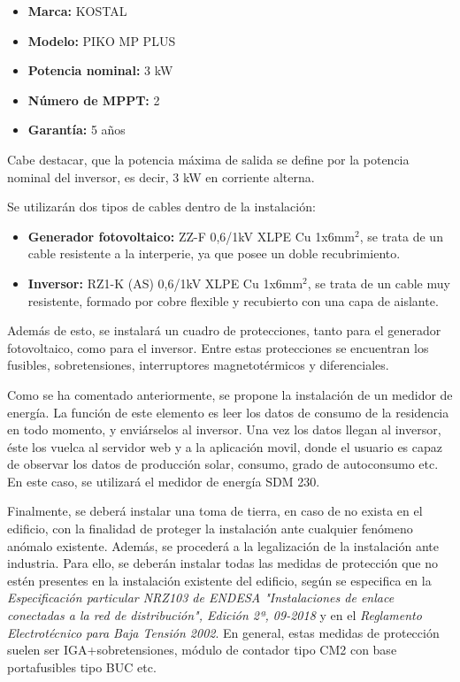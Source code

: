 \begin{spacing}{1.2}
\begin{itemize}\itemsep1pt \parskip0pt 
\item \textbf{Marca:} KOSTAL 
\item \textbf{Modelo:} PIKO MP PLUS
\item \textbf{Potencia nominal:} 3 kW
\item \textbf{Número de MPPT:} 2
\item \textbf{Garantía:} 5 años
\end{itemize}

Cabe destacar, que la potencia máxima de salida se define por la potencia nominal del inversor, es decir, 3 kW en corriente alterna.

Se utilizarán dos tipos de cables dentro de la instalación:

\begin{itemize}\itemsep1pt \parskip0pt 
\item \textbf{Generador fotovoltaico:} ZZ-F 0,6/1kV XLPE Cu 1x6mm$^2$, se trata de un cable resistente a la interperie, ya que posee un doble recubrimiento. 
\item \textbf{Inversor:} RZ1-K (AS) 0,6/1kV XLPE Cu 1x6mm$^2$, se trata de un cable muy resistente, formado por cobre flexible y recubierto con una capa de aislante.
\end{itemize}

Además de esto, se instalará un cuadro de protecciones, tanto para el generador fotovoltaico, como para el inversor. Entre estas protecciones se encuentran los fusibles, sobretensiones, interruptores magnetotérmicos y diferenciales.

Como se ha comentado anteriormente, se propone la instalación de un medidor de energía. La función de este elemento es leer los datos de consumo de la residencia en todo momento, y enviárselos al inversor. Una vez los datos llegan al inversor, éste los vuelca al servidor web y a la aplicación movil, donde el usuario es capaz de observar los datos de producción solar, consumo, grado de autoconsumo etc. En este caso, se utilizará el medidor de energía SDM 230.

Finalmente, se deberá instalar una toma de tierra, en caso de no exista en el edificio, con la finalidad de proteger la instalación ante cualquier fenómeno anómalo existente.
Además, se procederá a la legalización de la instalación ante industria. Para ello, se deberán instalar todas las medidas de protección que no estén presentes en la instalación existente del edificio, según se especifica en la \textit{Especificación particular NRZ103 de ENDESA "Instalaciones de enlace conectadas a la red de distribución", Edición 2ª, 09-2018} y en el \textit{Reglamento Electrotécnico para Baja Tensión 2002}. En general, estas medidas de protección suelen ser IGA+sobretensiones, módulo de contador tipo CM2 con base portafusibles tipo BUC etc.


\end{spacing}

